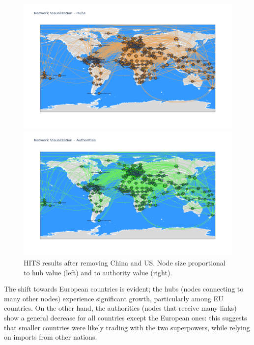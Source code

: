 \documentclass[12pt, a4paper]{article}
\begin{document}
\begin{figure}[!ht]
\centering
\begin{minipage}[b]{0.49\textwidth}
    \centering
    \includegraphics[width=\textwidth]{figures/question4/figure_10_h2.png}
\end{minipage}
\hfill
\begin{minipage}[b]{0.49\textwidth}
    \centering
    \includegraphics[width=\textwidth]{figures/question4/figure_10_a2.png}
\end{minipage}
\captionsetup{font=scriptsize,labelfont=bf}
\caption{HITS results after removing China and US. Node size proportional to hub value (left) and to authority value (right).}
\label{fig:figure9}
\end{figure}

The shift towards European countries is evident; the hubs (nodes connecting to many other nodes) experience significant growth, particularly among EU countries. On the other hand, the authorities (nodes that receive many links) show a general decrease for all countries except the European ones: this suggests that smaller countries were likely trading with the two superpowers, while relying on imports from other nations.
\end{document}
